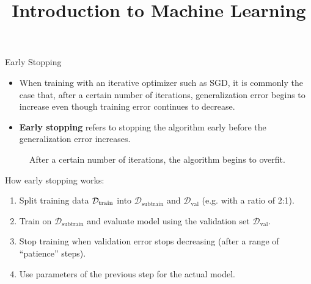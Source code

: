 \documentclass[11pt,compress,t,notes=noshow, xcolor=table]{beamer}
\title{Introduction to Machine Learning}
\date{}
\begin{document}



\begin{vbframe}{Early Stopping}
  
  \begin{itemize}
    \item When training with an iterative optimizer such as SGD, it is commonly the case that, after a certain number of iterations, generalization error begins to increase even though training error continues to decrease.     
    \item \textbf{Early stopping} refers to stopping the algorithm early before the generalization error increases.
  \end{itemize}
  \begin{figure}
    \centering
      \caption{After a certain number of iterations, the algorithm begins to overfit.}
  \end{figure}
\framebreak
  How early stopping works:
  \begin{enumerate}
    \item Split training data $\mathcal{D}_{\text{train}}$ into $\mathcal{D}_{\text{subtrain}}$ and $\mathcal{D}_{\text{val}}$ (e.g. with a ratio of 2:1).
    \item Train on $\mathcal{D}_{\text{subtrain}}$ and evaluate model using the validation set $\mathcal{D}_{\text{val}}$.
    \item Stop training when validation error stops decreasing (after a range of \enquote{patience} steps).
    \item Use parameters of the previous step for the actual model.

\end{enumerate}
\end{vbframe}
\end{document}
